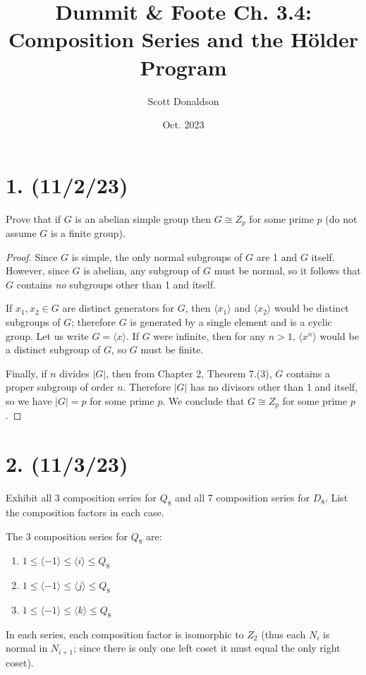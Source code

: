 \documentclass{article}
\title{Dummit \& Foote Ch. 3.4: Composition Series and the Hölder Program}
\author{Scott Donaldson}
\date{Oct. 2023}
\begin{document}
\maketitle

\section*{1. (11/2/23)}

Prove that if $G$ is an abelian simple group then $G \cong Z_p$ for some prime $p$ (do not assume $G$ is a finite group).

\begin{proof}
    Since $G$ is simple, the only normal subgroups of $G$ are 1 and $G$ itself. However, since $G$ is abelian, any subgroup of $G$ must be normal, so it follows that $G$ contains \emph{no} subgroups other than 1 and itself.

    If $x_1, x_2 \in G$ are distinct generators for $G$, then $\langle x_1 \rangle$ and $\langle x_2 \rangle$ would be distinct subgroups of $G$; therefore $G$ is generated by a single element and is a cyclic group. Let us write $G = \langle x \rangle$. If $G$ were infinite, then for any $n > 1$, $\langle x^n \rangle$ would be a distinct subgroup of $G$, so $G$ must be finite.

    Finally, if $n$ divides $|G|$, then from Chapter 2, Theorem 7.(3), $G$ contains a proper subgroup of order $n$. Therefore $|G|$ has no divisors other than 1 and itself, so we have $|G| = p$ for some prime $p$. We conclude that $G \cong Z_p$ for some prime $p$.
\end{proof}

\section*{2. (11/3/23)}

Exhibit all 3 composition series for $Q_8$ and all 7 composition series for $D_8$. List the composition factors in each case.

The 3 composition series for $Q_8$ are:
\begin{enumerate}[itemsep=0em]
    \item $1 \leq \langle -1 \rangle \leq \langle i \rangle \leq Q_8$
    \item $1 \leq \langle -1 \rangle \leq \langle j \rangle \leq Q_8$
    \item $1 \leq \langle -1 \rangle \leq \langle k \rangle \leq Q_8$
\end{enumerate}
In each series, each composition factor is isomorphic to $Z_2$ (thus each $N_i$ is normal in $N_{i + 1}$; since there is only one left coset it must equal the only right coset).
\end{document}
